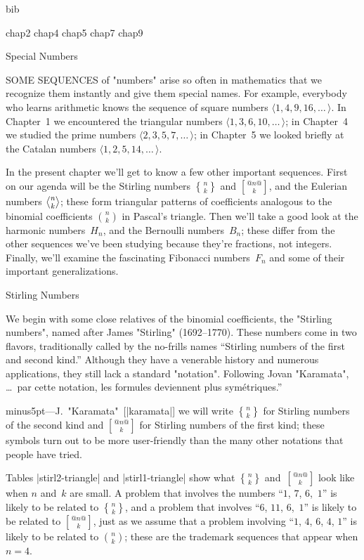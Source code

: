 
 bib

 chap2
 chap4
 chap5
 chap7
 chap9

 Special Numbers

SOME SEQUENCES of "numbers" arise so often in mathematics that we recognize them
instantly and give them special names.
For example, everybody who learns arithmetic knows the sequence
of square numbers $\langle 1,4,9,16,\ldots\,\rangle$.
In Chapter~1 we encountered
the triangular numbers $\langle 1,3,6,10,\ldots\,\rangle$;
in Chapter~4 we studied
the prime numbers $\langle 2,3,5,7,\ldots\,\rangle$;
in Chapter~5 we looked briefly at
the Catalan numbers $\langle 1,2,5,14,\ldots\,\rangle$.

In the present chapter we'll get to know a few other important sequences.
First on our agenda will be the Stirling numbers $n\brace k$ and
$@n@\brack k$, and the Eulerian numbers $n\euler k$; these form triangular
patterns of coefficients analogous to the binomial coefficients $n\choose k$
in Pascal's triangle.
Then we'll take a good look at the harmonic numbers~$H_n$, and
the Bernoulli numbers~$B_n$; these differ from the other sequences we've been
studying because they're fractions, not integers.
Finally, we'll examine the fascinating Fibonacci numbers~$F_n$ and some
of their important generalizations.

 Stirling Numbers

We begin with some close relatives of the binomial coefficients, the
"Stirling numbers", named after James "Stirling" (1692--1770). These numbers
come in two flavors, traditionally called by the no-frills names
``Stirling numbers of the first and second kind.\qback''
Although they have a venerable history and numerous applications, they
still lack a standard "notation". Following Jovan "Karamata",
\g\noindent{}\dots\ par cette notation, les formules deviennent plus sym\'etriques.''
\par\hfill\hskip0pt minus5pt\dash---J.~"Karamata"~[|karamata|]\g
we will write $n\brace k$ for Stirling
numbers of the second kind and $@n@\brack k$ for Stirling numbers
of the first kind; these symbols turn out to be more
user-friendly than the many other notations that people have tried.

Tables |stirl2-triangle| and |stirl1-triangle| show what
$n\brace k$ and~$@n@\brack k$ look like when $n$ and~$k$ are small.
A problem that involves the numbers 
``$1$, $7$, $6$,~$1$'' is likely to be related to $n\brace k$,
 and a problem that involves
``$6$, $11$, $6$,~$1$'' is
likely to be related to $@n@\brack k$,
just as we assume that a problem involving ``$1$, $4$, $6$, $4$, $1$''
is likely to be related to $n\choose k$;
these are the trademark sequences that appear when $n=4$.

